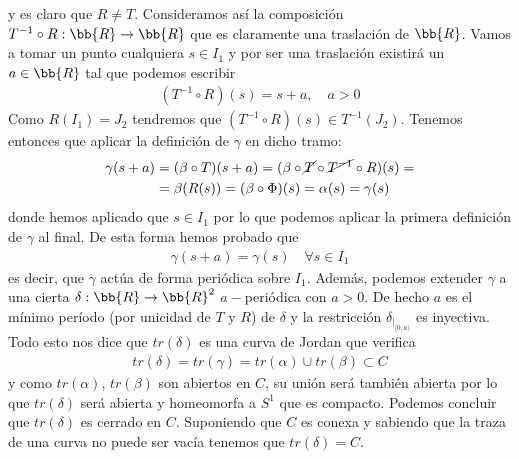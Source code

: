 \begin{observacion}
\begin{enumerate}
\begin{figure}[H]
%
        \end{figure}
        y es claro que $R\neq T$. Consideramos así la composición $T^{-1} \circ R : \bb{R} \to \bb{R}$ que es claramente una traslación de $\bb{R}$. Vamos a tomar un punto cualquiera $s\in I_1$ y por ser una traslación existirá un $a\in \bb{R}$ tal que podemos escribir
        \begin{gather*}
            (T^{-1} \circ R)(s) = s + a,\quad a>0
        \end{gather*}
        Como $R(I_1) = J_2$ tendremos que $(T^{-1} \circ R)(s)\in T^{-1}(J_2)$. Tenemos entonces que aplicar la definición de $\gamma$ en dicho tramo:
        \begin{align*}
            \gamma(s+a) &= (\beta \circ T) (s + a) = (\beta \circ\cancel{T} \circ \cancel{T^{-1}} \circ R) (s) = \\
            &= \beta(R(s)) = (\beta \circ \Phi)(s) = \alpha(s) = \gamma(s)
        \end{align*}
        donde hemos aplicado que $s\in I_1$ por lo que podemos aplicar la primera definición de $\gamma$ al final. De esta forma hemos probado que
        \begin{gather*}
            \gamma(s+a) = \gamma(s) \quad \forall s \in I_1
        \end{gather*}
        es decir, que $\gamma$ actúa de forma periódica sobre $I_1$. Además, podemos extender $\gamma$ a una cierta $\delta : \bb{R} \to \bb{R}^2$ $a-$periódica con $a>0$. De hecho $a$ es el mínimo período (por unicidad de $T$ y $R$) de $\delta$ y la restricción $\delta_{|_{[0,a)}}$ es inyectiva.\\

        Todo esto nos dice que $tr(\delta)$ es una curva de Jordan que verifica
        \begin{gather*}
            tr(\delta) = tr(\gamma) = tr(\alpha) \cup tr(\beta) \subset C
        \end{gather*}
        y como $tr(\alpha)$, $tr(\beta)$ son abiertos en $C$, su unión será también abierta por lo que $tr(\delta)$ será abierta y homeomorfa a $S^1$ que es compacto. Podemos concluir que $tr(\delta)$ es cerrado en $C$. Suponiendo que $C$ es conexa y sabiendo que la traza de una curva no puede ser vacía tenemos que $tr(\delta)=C$.\\


\end{enumerate}
\end{observacion}
